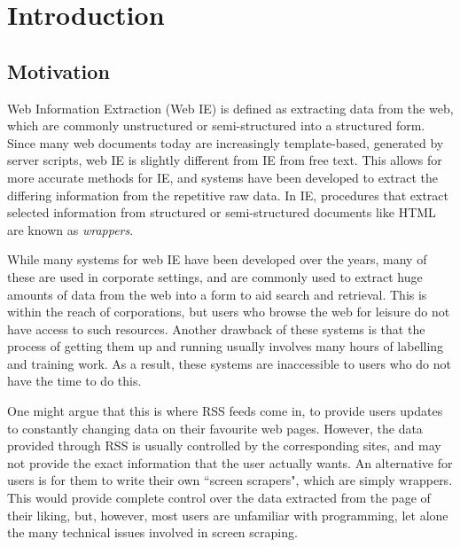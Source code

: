 \chapter{Introduction}

\section{Motivation}
Web Information Extraction (Web IE) is defined as extracting data from the web,
which are commonly unstructured or semi-structured into a structured form.
Since many web documents today are increasingly template-based, generated by server scripts,
 web IE is slightly different from IE
from free text. This allows for more accurate methods for IE, and systems have been developed
to extract the differing information from the repetitive raw data.
In IE, procedures that extract selected information from structured or semi-structured
documents like HTML are known as \textit{wrappers}.

While many systems for web IE have been developed over the years, many of
these are used in corporate settings, and are commonly used to extract huge amounts of data from the web
into a form to aid search and retrieval. This is within the reach of
corporations, but users who browse the web for leisure do not have access to such resources.
Another drawback of these systems is that the process of getting them up and running usually
involves many hours of labelling and training work. As a result, these systems are inaccessible
to users who do not have the time to do this. 

One might argue that this is where RSS feeds come in, to provide users updates to constantly
changing data on their favourite web pages. However, the data provided through RSS is usually controlled by the
corresponding sites, and may not provide the exact information that the user actually wants. An
alternative for users is for them to write their own ``screen scrapers", which are simply wrappers. This would provide
complete control over the data extracted from the page of their liking, but, however,
most users are unfamiliar with programming, let alone the many
technical issues involved in screen scraping.


